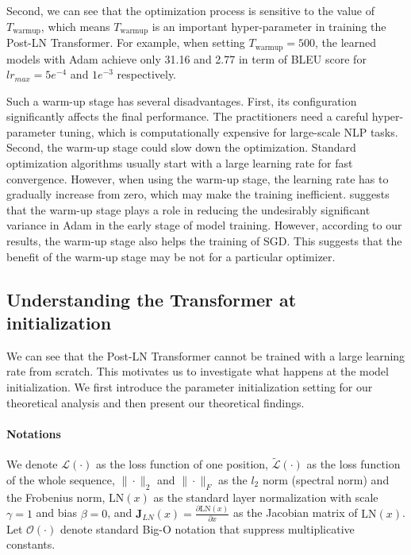 \documentclass{article}
\begin{document}
Second, we can see that the optimization process is sensitive to the value of $T_{\text{warmup}}$, which means $T_{\text{warmup}}$ is an important hyper-parameter in training the Post-LN Transformer. For example, when setting $T_{\text{warmup}}=500$, the learned models with Adam achieve only 31.16 and 2.77 in term of BLEU score for $lr_{max}=5e^{-4}$ and $1e^{-3}$ respectively. 

Such a warm-up stage has several disadvantages. First, its configuration significantly affects the final performance. The practitioners need a careful hyper-parameter tuning, which is computationally expensive for large-scale NLP tasks. Second, the warm-up stage could slow down the optimization. Standard optimization algorithms usually start with a large learning rate for fast convergence. However, when using the warm-up stage, the learning rate has to gradually increase from zero, which may make the training inefficient. 
\citet{liu2019variance} suggests that the warm-up stage plays a role in reducing the undesirably significant variance in Adam in the early stage of model training. However, according to our results, the warm-up stage also helps the training of SGD. This suggests that the benefit of the warm-up stage may be not for a particular optimizer.

\subsection{Understanding the Transformer at initialization}

We can see that the Post-LN Transformer cannot be trained with a large learning rate from scratch. This motivates us to investigate what happens at the model initialization. We first introduce the parameter initialization setting for our theoretical analysis and then present our theoretical findings.

\paragraph{Notations}
We denote $\mathcal{L}(\cdot)$ as the loss function of one position, $\tilde{\mathcal{L}}(\cdot)$ as the loss function of the whole sequence, $\|\cdot\|_2$ and $\|\cdot\|_F$ as the $l_2$ norm (spectral norm) and the Frobenius norm, $\text{LN}(x)$ as the standard layer normalization with scale $\gamma=1$ and bias $\beta=0$, and $\mathbf{J}_{LN}(x)=\frac{\partial \text{LN}(x)}{\partial x}$ as the Jacobian matrix of $\text{LN}(x)$. Let $\mathcal{O}(\cdot)$ denote standard Big-O notation that suppress multiplicative
constants.
\end{document}
